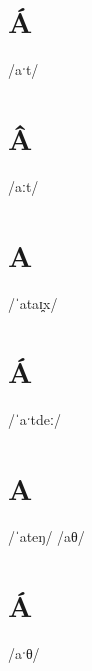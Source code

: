 \documentclass[10pt,a4paper,twoside]{book}
\begin{document}
\section*{Á}

\begin{multicols}{3}
 {/aˑt/} {}
\end{multicols}

\section*{Â}

\begin{multicols}{3}
 {/aːt/} {}
\end{multicols}

\section*{A}

\begin{multicols}{3}
 {/ˈataɪ̯x/} {}
\end{multicols}

\section*{Á}

\begin{multicols}{3}
 {/ˈaˑtdeː/} {}
\end{multicols}

\section*{A}

\begin{multicols}{3}
 {/ˈateŋ/} {}
 {/aθ/} {}
\end{multicols}

\section*{Á}

\begin{multicols}{3}
 {/aˑθ/} {}
\end{multicols}
\end{document}
